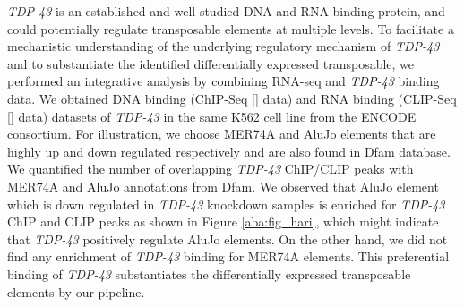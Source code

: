 \documentclass[wsdraft]{ws-procs11x85}
\begin{document}
\textit{TDP-43} is an established and well-studied DNA and RNA binding protein,
and could potentially regulate transposable elements at multiple levels.\cite{tan2016extensive} 
To facilitate a mechanistic understanding of the underlying regulatory mechanism of \textit{TDP-43} and to substantiate the identified differentially expressed transposable, we performed an integrative analysis by combining RNA-seq and \textit{TDP-43} binding data. 
We obtained DNA binding (ChIP-Seq [] data) and RNA binding (CLIP-Seq [] data)
% 
% 
datasets of \textit{TDP-43} in the same K562 cell line from the ENCODE consortium.
% 
% 
For illustration, we choose MER74A and AluJo elements that are highly up and down regulated respectively and are also found in 
Dfam database.\cite{hubley2015dfam} We quantified the number of overlapping \textit{TDP-43} ChIP/CLIP peaks with MER74A and AluJo annotations 
from Dfam. We observed that AluJo element which is down regulated in \textit{TDP-43} knockdown samples is enriched for \textit{TDP-43} 
ChIP and CLIP peaks as shown in Figure \ref{aba:fig_hari}, which might indicate that \textit{TDP-43} positively regulate AluJo elements. 
% 
% 
On the other hand, we did not find any enrichment of \textit{TDP-43} binding for MER74A elements. This preferential binding of \textit{TDP-43} substantiates the differentially expressed transposable elements by our pipeline. 
\end{document}
